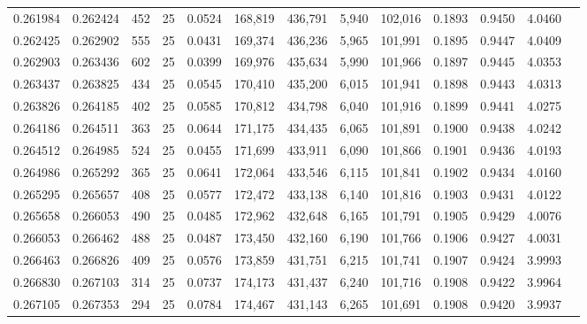\begin{tabular}{rrrrrrrrrrrrr}
0.261984 & 0.262424 &   452 &  25 &                                     0.0524 & 168,819 & 436,791 &   5,940 & 102,016 & 0.1893 & 0.9450 & 4.0460 \\
0.262425 & 0.262902 &   555 &  25 &                                     0.0431 & 169,374 & 436,236 &   5,965 & 101,991 & 0.1895 & 0.9447 & 4.0409 \\
0.262903 & 0.263436 &   602 &  25 &                                     0.0399 & 169,976 & 435,634 &   5,990 & 101,966 & 0.1897 & 0.9445 & 4.0353 \\
0.263437 & 0.263825 &   434 &  25 &                                     0.0545 & 170,410 & 435,200 &   6,015 & 101,941 & 0.1898 & 0.9443 & 4.0313 \\
0.263826 & 0.264185 &   402 &  25 &                                     0.0585 & 170,812 & 434,798 &   6,040 & 101,916 & 0.1899 & 0.9441 & 4.0275 \\
0.264186 & 0.264511 &   363 &  25 &                                     0.0644 & 171,175 & 434,435 &   6,065 & 101,891 & 0.1900 & 0.9438 & 4.0242 \\
0.264512 & 0.264985 &   524 &  25 &                                     0.0455 & 171,699 & 433,911 &   6,090 & 101,866 & 0.1901 & 0.9436 & 4.0193 \\
0.264986 & 0.265292 &   365 &  25 &                                     0.0641 & 172,064 & 433,546 &   6,115 & 101,841 & 0.1902 & 0.9434 & 4.0160 \\
0.265295 & 0.265657 &   408 &  25 &                                     0.0577 & 172,472 & 433,138 &   6,140 & 101,816 & 0.1903 & 0.9431 & 4.0122 \\
0.265658 & 0.266053 &   490 &  25 &                                     0.0485 & 172,962 & 432,648 &   6,165 & 101,791 & 0.1905 & 0.9429 & 4.0076 \\
0.266053 & 0.266462 &   488 &  25 &                                     0.0487 & 173,450 & 432,160 &   6,190 & 101,766 & 0.1906 & 0.9427 & 4.0031 \\
0.266463 & 0.266826 &   409 &  25 &                                     0.0576 & 173,859 & 431,751 &   6,215 & 101,741 & 0.1907 & 0.9424 & 3.9993 \\
0.266830 & 0.267103 &   314 &  25 &                                     0.0737 & 174,173 & 431,437 &   6,240 & 101,716 & 0.1908 & 0.9422 & 3.9964 \\
0.267105 & 0.267353 &   294 &  25 &                                     0.0784 & 174,467 & 431,143 &   6,265 & 101,691 & 0.1908 & 0.9420 & 3.9937 \\

\end{tabular}
